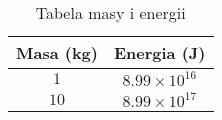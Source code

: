 \begin{table}[ht]
    \centering
    \begin{tabular}{|c|c|}
    \hline
    Masa (kg) & Energia (J) \\ \hline
    $1$        & $8.99 \times 10^{16}$ \\ \hline
    $10$       & $8.99 \times 10^{17}$ \\ \hline
    \end{tabular}
    \caption{Tabela masy i energii}
    \label{tab:mass-energy}
\end{table}
